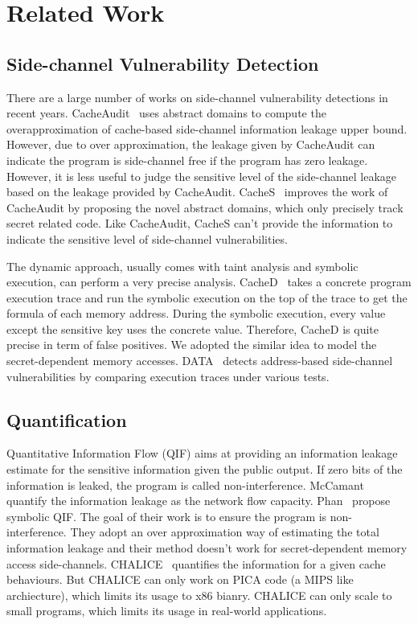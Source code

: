 \section{Related Work}

\subsection{Side-channel Vulnerability Detection}

There are a large number of works on side-channel vulnerability detections in recent years.
CacheAudit~\cite{182946} uses abstract domains to compute the overapproximation of cache-based
side-channel information leakage upper bound. However, due to over approximation, the leakage
given by CacheAudit can indicate the program is side-channel free if the program has zero leakage. 
However, it is less useful to judge the sensitive level of the side-channel leakage based on the
leakage provided by CacheAudit. CacheS~\cite{236338} improves the work of CacheAudit by proposing 
the novel abstract domains, which only precisely track secret related code. Like CacheAudit, CacheS
can't provide the information to indicate the sensitive level of side-channel vulnerabilities.

The dynamic approach, usually comes with taint analysis and symbolic execution, can perform a very 
precise analysis. CacheD~\cite{203878} takes a concrete program execution trace and run the symbolic
execution on the top of the trace to get the formula of each memory address. During the symbolic
execution, every value except the sensitive key uses the concrete value. Therefore, CacheD is quite 
precise in term of false positives. We adopted the similar idea to model the  secret-dependent memory 
accesses.  DATA~\cite{217537} detects address-based side-channel vulnerabilities by comparing 
execution traces under various tests. 

\subsection{Quantification}
Quantitative Information Flow (QIF) aims at providing an information leakage estimate for the
sensitive information given the public output. If zero bits of the information is leaked, the 
program is called non-interference. McCamant~\cite{McCamantE2008} quantify the information leakage
as the network flow capacity. Phan~\cite{Phan:2012:SQI:2382756.2382791} propose symbolic QIF. The
goal of their work is to ensure the program is non-interference. They adopt an over
approximation way of estimating the total information leakage and their method doesn't work for
secret-dependent memory access side-channels. CHALICE~\cite{Chattopadhyay:2017:QIL:3127041.3127044}
quantifies the information for a given cache behaviours. But CHALICE can only 
work on PICA code (a MIPS like archiecture), which limits its usage to x86 bianry. 
CHALICE can only scale to small programs, which limits its usage in
real-world applications.
